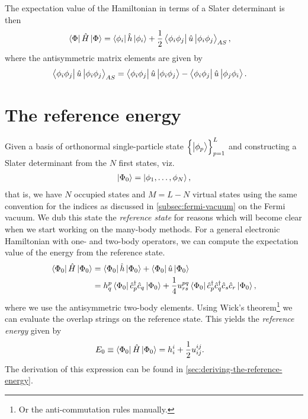             The expectation value of the Hamiltonian in terms of a Slater
            determinant is then
            \begin{align}
                \bra{\Phi}\hat{H}\ket{\Phi}
                &= \bra{\phi_i}\hat{h}\ket{\phi_i}
                + \frac{1}{2}\bra{\phi_i\phi_j}\hat{u}\ket{\phi_i\phi_j}_{AS},
            \end{align}
            where the antisymmetric matrix elements are given by
            \begin{align}
                \bra{\phi_i\phi_j}\hat{u}\ket{\phi_i\phi_j}_{AS}
                &= \bra{\phi_i\phi_j}\hat{u}\ket{\phi_i\phi_j}
                - \bra{\phi_i\phi_j}\hat{u}\ket{\phi_j\phi_i}.
                \label{eq:antisymmetric_two_body}
            \end{align}

    \section{The reference energy}
        Given a basis of orthonormal single-particle state
        $\left\{ \ket{\phi_p} \right\}_{p = 1}^{L}$ and constructing a Slater determinant
        from the $N$ first states, viz.
        \begin{align}
            \ket{\Phi_{0}} = \ket{\phi_1, \dots, \phi_N},
        \end{align}
        that is, we have $N$ occupied states and $M = L - N$ virtual states
        using the same convention for the indices as discussed in
        \autoref{subsec:fermi-vacuum} on the Fermi vacuum.
        We dub this state the \emph{reference state} for reasons which will
        become clear when we start working on the many-body methods.
        For a general electronic Hamiltonian with one- and two-body operators,
        we can compute the expectation value of the energy from the reference
        state.
        \begin{align}
            \bra{\Phi_{0}}\hat{H}\ket{\Phi_{0}}
            &=
            \bra{\Phi_{0}}\hat{h}\ket{\Phi_{0}}
            + \bra{\Phi_{0}}\hat{u}\ket{\Phi_{0}}
            \\
            &=
            h^{p}_{q}
            \bra{\Phi_{0}}\hat{c}_{p}^{\dagger}\hat{c}_{q}\ket{\Phi_{0}}
            + \frac{1}{4}
            u^{pq}_{rs}
            \bra{\Phi_{0}}\hat{c}_{p}^{\dagger}\hat{c}_{q}^{\dagger}\hat{c}_{s}\hat{c}_{r}\ket{\Phi_{0}},
        \end{align}
        where we use the antisymmetric two-body elements.
        Using Wick's theorem\footnote{%
            Or the anti-commutation rules manually.
        }%
        we can evaluate the overlap strings on the reference state.
        This yields the \emph{reference energy} given by
        \begin{align}
            E_{0}
            &\equiv
            \bra{\Phi_{0}}\hat{H}\ket{\Phi_{0}}
            =
            h^{i}_{i}
            + \frac{1}{2}u^{ij}_{ij}.
            \label{eq:reference-energy}
        \end{align}
        The derivation of this expression can be found in
        \autoref{sec:deriving-the-reference-energy}.

